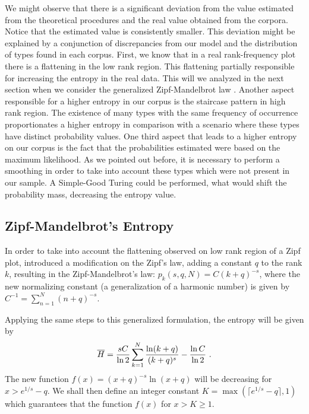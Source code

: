 We might observe that there is a significant deviation from the value estimated from the theoretical
procedures and the real value obtained from the corpora. Notice that the estimated value is consistently 
smaller. This deviation might be explained by a conjunction of discrepancies from our model and
the distribution of types found in each corpus. First, we know that in a real rank-frequency plot
there is a flattening in the low rank region. This flattening partially responsible for increasing
the entropy in the real data. This will we analyzed in the next section when we consider the 
generalized Zipf-Mandelbrot law \citep{mandelbrot1965}. Another aspect responsible for a higher 
entropy in our corpus is the staircase pattern in high rank region. The existence of many types
with the same frequency of occurrence proportionates a higher entropy in comparison with
a scenario where these types have distinct probability values. One third aspect that leads to
a higher entropy on our corpus is the fact that the probabilities estimated were based on
the maximum likelihood. As we pointed out before, it is necessary to perform a smoothing
in order to take into account these types which were not present in our sample. 
A Simple-Good Turing \citep{galesampson95} could be performed, what would  
shift the probability mass, decreasing the entropy value.



\subsection{Zipf-Mandelbrot's Entropy}
In order to take into account the flattening observed on low rank region of a Zipf plot, \cite{mandelbrot1965}
introduced a modification on the Zipf's law, adding a constant $q$ to the rank $k$, resulting in the Zipf-Mandelbrot's
law: $p_k(s,q,N) = C(k+q)^{-s}$, where the new normalizing constant (a generalization of a harmonic number)
is given by $C^{-1}=\sum_{n=1}^{N}(n+q)^{-s}$.

Applying the same steps to this generalized formulation, the entropy will be given by
\begin{equation}
\label{eq:ent_zipfmand_source}
\overline{H} = \frac{sC}{\ln 2} \sum_{k=1}^N \frac{\ln (k+q)}{(k+q)^s} - \frac{\ln C}{\ln 2} \textmd{ .}
\end{equation}
The new function $f(x)=(x+q)^{-s} \ln (x+q)$ will be decreasing for $x>e^{1/s}-q$. 
We shall then define an integer constant $K = \max(\lceil e^{1/s}-q \rceil,1)$ which guarantees that
the function $f(x)$ for $x>K \geq 1$.

